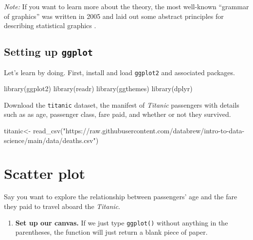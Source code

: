 \documentclass[
]{book}
\newenvironment{Shaded}{\begin{snugshade}}{\end{snugshade}}
\newcommand{\FunctionTok}[1]{\textcolor[rgb]{0.00,0.00,0.00}{#1}}
\newcommand{\NormalTok}[1]{#1}
\newcommand{\OtherTok}[1]{\textcolor[rgb]{0.56,0.35,0.01}{#1}}
\newcommand{\StringTok}[1]{\textcolor[rgb]{0.31,0.60,0.02}{#1}}
\providecommand{\tightlist}{%
  \setlength{\itemsep}{0pt}\setlength{\parskip}{0pt}}
\begin{document}
\emph{Note:} If you want to learn more about the theory, the most well-known ``grammar of graphics'' was written in 2005 and laid out some abstract principles for describing statistical graphics \citep{10.5555/1088896}.

\hypertarget{setting-up-ggplot}{%
\subsection*{\texorpdfstring{Setting up \texttt{ggplot}}{Setting up ggplot}}\label{setting-up-ggplot}}

Let's learn by doing. First, install and load \texttt{ggplot2} and associated packages.

\begin{Shaded}
\begin{Highlighting}[]
\FunctionTok{library}\NormalTok{(ggplot2)}
\FunctionTok{library}\NormalTok{(readr)}
\FunctionTok{library}\NormalTok{(ggthemes)}
\FunctionTok{library}\NormalTok{(dplyr)}
\end{Highlighting}
\end{Shaded}

Download the \texttt{titanic} dataset, the manifest of \emph{Titanic} passengers with details such as as age, passenger class, fare paid, and whether or not they survived.

\begin{Shaded}
\begin{Highlighting}[]
\NormalTok{titanic}\OtherTok{\textless{}{-}} \FunctionTok{read\_csv}\NormalTok{(}\StringTok{"https://raw.githubusercontent.com/databrew/intro{-}to{-}data{-}science/main/data/deaths.csv"}\NormalTok{)}
\end{Highlighting}
\end{Shaded}

\hypertarget{scatter-plot}{%
\section*{Scatter plot}\label{scatter-plot}}

Say you want to explore the relationship between passengers' age and the fare they paid to travel aboard the \emph{Titanic}.

\begin{enumerate}
\def\labelenumi{(\arabic{enumi})}
\tightlist
\item
  \textbf{Set up our canvas.} If we just type \texttt{ggplot()} without anything in the parentheses, the function will just return a blank piece of paper.
\end{enumerate}
\end{document}

